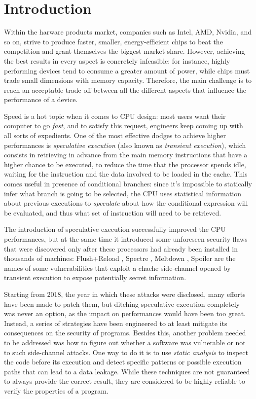 \documentclass[12pt,a4paper]{book}
\theoremstyle{definition}
\begin{document}
	\chapter{Introduction}\label{chapter:intro}
	Within the harware products market, companies such as Intel, AMD, Nvidia, and so on, strive to produce faster, smaller, energy-efficient chips to beat the competition and grant themselves the biggest market share. However, achieving the best results in every aspect is concretely infeasible: for instance, highly performing devices tend to consume a greater amount of power, while chips must trade small dimensions with memory capacity. Therefore, the main challenge is to reach an acceptable trade-off between all the different aspects that influence the performance of a device.

	Speed is a hot topic when it comes to CPU design: most users want their computer to go \textit{fast}, and to satisfy this request, engineers keep coming up with all sorts of expedients. One of the most effective dodges to achieve higher performances is \textit{speculative execution} (also known as \textit{transient execution}), which consists in retrieving in advance from the main memory instructions that have a higher chance to be executed, to reduce the time that the processor spends idle, waiting for the instruction and the data involved to be loaded in the cache. 
	This comes useful in presence of conditional branches: since it's impossible to statically infer what branch is going to be selected, the CPU uses statistical information about previous executions to \textit{speculate} about how the conditional expression will be evaluated, and thus what set of instruction will need to be retrieved.
	
	The introduction of speculative execution successfully improved the CPU performances, but at the same time it introduced some unforeseen security flaws that were discovered only after these processors had already been installed in thousands of machines: Flush+Reload \cite{Yarom2014}, Spectre \cite{Kocher2019}, Meltdown \cite{Lipp2018}, Spoiler \cite{Islam2019} are the names of some vulnerabilities that exploit a chache side-channel opened by transient execution to expose potentially secret information.
	
	Starting from 2018, the year in which these attacks were disclosed, many efforts have been made to patch them, but ditching speculative execution completely was never an option, as the impact on performances would have been too great. Instead, a series of strategies have been engineered to at least mitigate its consequences on the security of programs. Besides this, another problem needed to be addressed was how to figure out whether a software was vulnerable or not to such side-channel attacks. One way to do it is to use \textit{static analysis} to inspect the code before its execution and detect specific patterns or possible execution paths that can lead to a data leakage. While these techniques are not guaranteed to always provide the correct result, they are considered to be highly reliable to verify the properties of a program.
	
\end{document}
